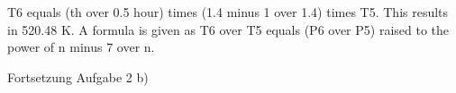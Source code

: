 T6 equals (th over 0.5 hour) times (1.4 minus 1 over 1.4) times T5. This results in 520.48 K. A formula is given as T6 over T5 equals (P6 over P5) raised to the power of n minus 7 over n.

Fortsetzung Aufgabe 2 b)